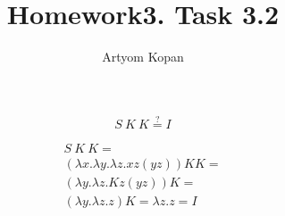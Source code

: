 \documentclass{article}
\title{Homework3. Task 3.2}
\author{Artyom Kopan}
\begin{document}
\huge
\maketitle

$$
S\:K\:K \overset{?}{=} I
$$

\begin{gather}
S\:K\:K =\\ (\lambda x.\lambda y.\lambda z.xz(yz)) K K =\\ (\lambda y.\lambda z.Kz(yz)) K =\\ (\lambda y.\lambda z.z) K = \lambda z.z = I
\end{gather}
\end{document}
